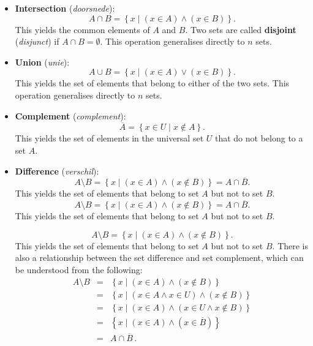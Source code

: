 \begin{itemize}
	\item \textbf{Intersection} (\textit{doorsnede}): 
	$$
	A\cap B=\left\{x\mid \left(x\in A\right)\wedge\left(x\in B\right)\right\}.
	$$
	This yields the common elements of $A$ and $B$. Two sets are called \textbf{disjoint} (\textit{disjunct}) if $A\cap B=\emptyset$. This operation generalises directly to $n$ sets. 
	\item \textbf{Union} (\textit{unie}):  
	$$
	A\cup B=\left\{x\mid \left(x\in A\right)\vee\left(x\in B\right)\right\}.
	$$
	This yields the set of elements that belong to either of the two sets. This operation generalises directly to $n$ sets. 
	\item \textbf{Complement} (\textit{complement}):   
	$$
	\overline{A}=\left\{x\in U\mid x\notin A \right\}.
	$$
	This yields the set of elements in the universal set $U$ that do not belong to a set $A$.
	\item \textbf{Difference} (\textit{verschil}): 
	\ifvc
	$$
	A\setminus B=\left\{x\mid \left(x\in A\right)\wedge\left(x\notin B\right)\right\}=A\cap\overline{B}.
	$$
	This yields the set of elements that belong to set $A$ but not to set $B$. 
	\fi
	\ifcalculus
	$$
	A\setminus B=\left\{x\mid \left(x\in A\right)\wedge\left(x\notin B\right)\right\}=A\cap\overline{B}.
	$$
	This yields the set of elements that belong to set $A$ but not to set $B$. 
	\fi
	
	\ifanalysis
	
		$$
		A\setminus B=\left\{x\mid \left(x\in A\right)\wedge\left(x\notin B\right)\right\}.
		$$
		This yields the set of elements that belong to set $A$ but not to set $B$. There is also a relationship between the set difference and set complement, which can be understood from the following:
		\begin{eqnarray*}
			A \setminus B&=& \left\{x\mid \left(x \in A\right) \land \left(x \notin B\right)\right\}\\
			&=& \left\{x\mid \left(x \in A \wedge x \in U\right)  \land \left(x \notin B\right)\right\}\\
			&=& \left\{x\mid \left(x \in A \right)\wedge \left( x \in U  \land x \notin B \right)\right\}\\
			&=& \left\{x\mid \left(x \in A\right) \wedge  \left(x \in  \overline{B}\right) \right\}\\
			&=& A\cap\overline{B}\,.
		\end{eqnarray*}
	

\end{itemize}
